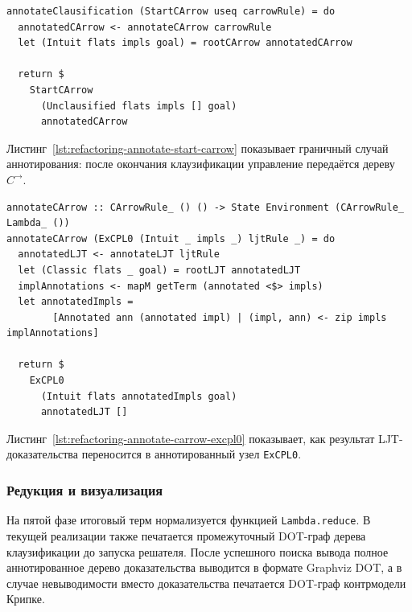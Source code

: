 \documentclass[14pt, russian]{scrartcl}
\begin{document}
\begin{listing}[!htb]
\caption{Переход от клаузификации к аннотированному $C^{\rightarrow}$}
\label{lst:refactoring-annotate-start-carrow}
\begin{verbatim}
annotateClausification (StartCArrow useq carrowRule) = do
  annotatedCArrow <- annotateCArrow carrowRule
  let (Intuit flats impls goal) = rootCArrow annotatedCArrow

  return $
    StartCArrow
      (Unclausified flats impls [] goal)
      annotatedCArrow
\end{verbatim}
\end{listing}

Листинг~\ref{lst:refactoring-annotate-start-carrow} показывает граничный случай
аннотирования: после окончания клаузификации управление передаётся дереву
$C^{\rightarrow}$.

\begin{listing}[!htb]
\caption{Аннотирование правила \texttt{ExCPL0}: \texttt{annotateCArrow}}
\label{lst:refactoring-annotate-carrow-excpl0}
\begin{verbatim}
annotateCArrow :: CArrowRule_ () () -> State Environment (CArrowRule_ Lambda_ ())
annotateCArrow (ExCPL0 (Intuit _ impls _) ljtRule _) = do
  annotatedLJT <- annotateLJT ljtRule
  let (Classic flats _ goal) = rootLJT annotatedLJT
  implAnnotations <- mapM getTerm (annotated <$> impls)
  let annotatedImpls =
        [Annotated ann (annotated impl) | (impl, ann) <- zip impls implAnnotations]

  return $
    ExCPL0
      (Intuit flats annotatedImpls goal)
      annotatedLJT []
\end{verbatim}
\end{listing}

Листинг~\ref{lst:refactoring-annotate-carrow-excpl0} показывает, как результат
LJT-доказательства переносится в аннотированный узел \texttt{ExCPL0}.

\subsubsection{Редукция и визуализация}

На пятой фазе итоговый терм нормализуется функцией \texttt{Lambda.reduce}.
В текущей реализации также печатается промежуточный DOT-граф дерева
клаузификации до запуска решателя. После успешного поиска вывода полное
аннотированное дерево доказательства выводится в формате Graphviz DOT, а в
случае невыводимости вместо доказательства печатается DOT-граф контрмодели
Крипке.
\end{document}
